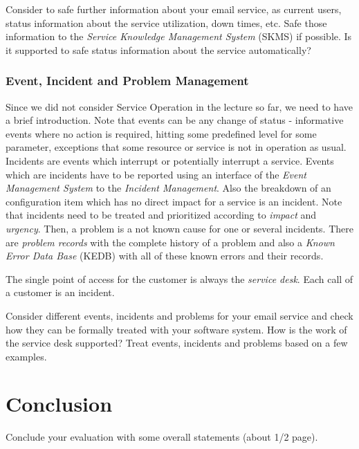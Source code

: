 Consider to safe further information about your email service, as current users, status information about the service utilization, down times, etc. Safe those information to the \emph{Service Knowledge Management System} (SKMS) if possible. Is it supported to safe status information about the service automatically?

\subsection{Event, Incident and Problem Management}
\label{sec:eventIncidentProblemManagement}

Since we did not consider Service Operation in the lecture so far, we need to have a brief introduction. Note that events can be any change of status - informative events where no action is required, hitting some predefined level for some parameter, exceptions that some resource or service is not in operation as usual. Incidents are events which interrupt or potentially interrupt a service. Events which are incidents have to be reported using an interface of the \emph{Event Management System} to the \emph{Incident Management}. Also the breakdown of an configuration item which has no direct impact for a service is an incident. Note that incidents need to be treated and prioritized according to \emph{impact} and \emph{urgency}. Then, a problem is a not known cause for one or several incidents. There are \emph{problem records} with the complete history of a problem and also a \emph{Known Error Data Base} (KEDB) with all of these known errors and their records.

The single point of access for the customer is always the \emph{service desk}. Each call of a customer is an incident.

Consider different events, incidents and problems for your email service and check how they can be formally treated with your software system. How is the work of the service desk supported? Treat events, incidents and problems based on a few examples. 

\chapter{Conclusion}

Conclude your evaluation with some overall statements (about 1/2 page).